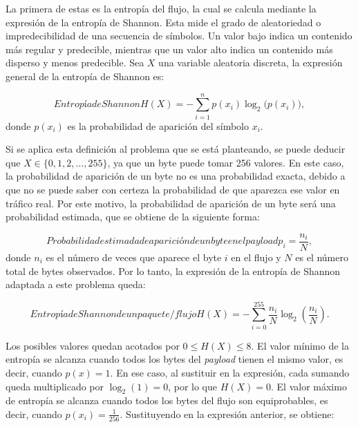La primera de estas es la entropía del flujo, la cual se calcula mediante la expresión de la entropía de Shannon. Esta mide el grado de aleatoriedad o impredecibilidad de una secuencia de símbolos. Un valor bajo indica un contenido más regular y predecible, mientras que un valor alto indica un contenido más disperso y menos predecible. Sea $X$ una variable aleatoria discreta, la expresión general de la entropía de Shannon es:

\begin{equation}[eq:shannon]{Entropía de Shannon}
H(X) = - \sum_{i=1}^{n} p(x_i)\log_2\bigl(p(x_i)\bigr),
\end{equation}donde $p(x_i)$ es la probabilidad de aparición del símbolo $x_i$.

Si se aplica esta definición al problema que se está planteando, se puede deducir que $X \in \{0,1,2,\dots,255\}$, ya que un byte puede tomar 256 valores. En este caso, la probabilidad de aparición de un byte no es una probabilidad exacta, debido a que no se puede saber con certeza la probabilidad de que aparezca ese valor en tráfico real. Por este motivo, la probabilidad de aparición de un byte será una probabilidad estimada, que se obtiene de la siguiente forma:

\begin{equation}{Probabilidad estimada de aparición de un byte en el payload}
p_i = \frac{n_i}{N},
\end{equation}donde $n_i$ es el número de veces que aparece el byte $i$ en el flujo y $N$ es el número total de bytes observados.
Por lo tanto, la expresión de la entropía de Shannon adaptada a este problema queda:

\begin{equation}{Entropía de Shannon de un paquete/flujo}
H(X) = - \sum_{i=0}^{255} \frac{n_i}{N}\log_2\left(\frac{n_i}{N}\right).
\end{equation}

Los posibles valores quedan acotados por $0 \leq H(X) \leq 8$. El valor mínimo de la entropía se alcanza cuando todos los bytes del \textit{payload} tienen el mismo valor, es decir, cuando $p(x)=1$. En ese caso, al sustituir en la expresión, cada sumando queda multiplicado por $\log_2(1)=0$, por lo que $H(X) = 0$. El valor máximo de entropía se alcanza cuando todos los bytes del flujo son equiprobables, es decir, cuando $p(x_i) = \frac{1}{256}$. Sustituyendo en la expresión anterior, se obtiene:

